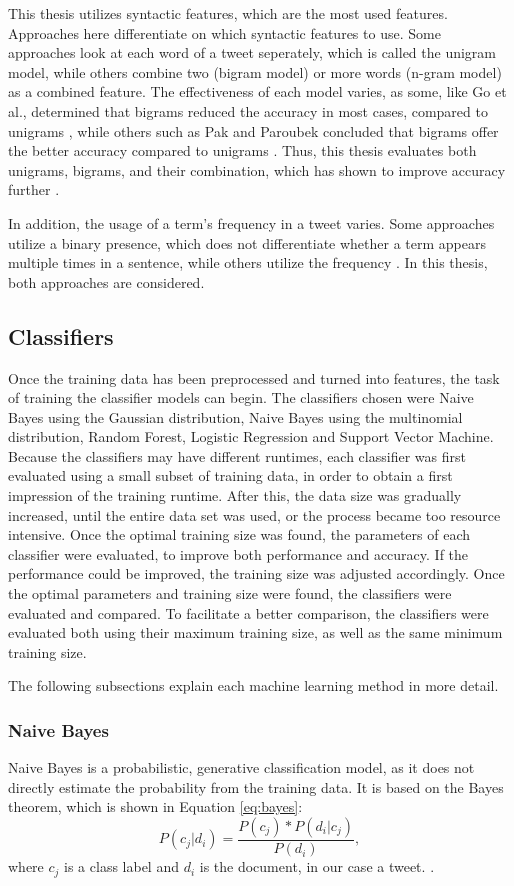 This thesis utilizes syntactic features, which are the most used features. Approaches here differentiate on which syntactic features to use. Some approaches look at each word of a tweet seperately, which is called the unigram model, while others combine two (bigram model) or more words (n-gram model) as a combined feature. The effectiveness of each model varies, as some, like Go et al., determined that bigrams reduced the accuracy in most cases, compared to unigrams \cite{GoBHaHua2009}, while others such as Pak and Paroubek concluded that bigrams offer the better accuracy compared to unigrams \cite{pak}. Thus, this thesis evaluates both unigrams, bigrams, and their combination, which has shown to improve accuracy further \cite{GoBHaHua2009}.

In addition, the usage of a term's frequency in a tweet varies. Some approaches utilize a binary presence, which does not differentiate whether a term appears multiple times in a sentence, while others utilize the frequency \cite{DBLP:journals/csur/GiachanouC16}. In this thesis, both approaches are considered.

\subsection{Classifiers}
Once the training data has been preprocessed and turned into features, the task of training the classifier models can begin. The classifiers chosen were Naive Bayes using the Gaussian distribution, Naive Bayes using the multinomial distribution, Random Forest, Logistic Regression and Support Vector Machine. Because the classifiers may have different runtimes, each classifier was first evaluated using a small subset of training data, in order to obtain a first impression of the training runtime. After this, the data size was gradually increased, until the entire data set was used, or the process became too resource intensive. Once the optimal training size was found, the parameters of each classifier were evaluated, to improve both performance and accuracy. If the performance could be improved, the training size was adjusted accordingly. Once the optimal parameters and training size were found, the classifiers were evaluated and compared. To facilitate a better comparison, the classifiers were evaluated both using their maximum training size, as well as the same minimum training size.

The following subsections explain each machine learning method in more detail.

    \subsubsection{Naive Bayes}
        Naive Bayes is a probabilistic, generative classification model, as it does not directly estimate the probability from the training data. It is based on the Bayes theorem, which is shown in Equation \eqref{eq:bayes}:
        \begin{equation}
            \label{eq:bayes}
            P(c_j|d_i) = \frac{P(c_j) * P(d_i|c_j)}{P(d_i)},
        \end{equation}
        where $c_j$ is a class label and $d_i$ is the document, in our case a tweet. \cite{DBLP:books/aw/TanSKK2019}. 
        

